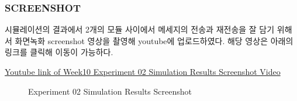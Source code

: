         \subsubsection{SCREENSHOT}
        시뮬레이션의 결과에서 2개의 모듈 사이에서 메세지의 전송과 재전송을 잘 담기 위해서 화면녹화 screenshot 영상을 촬영해 youtube에 업로드하였다. 해당 영상은 아래의 링크를 클릭해 이동이 가능하다.
        \vspace{-10mm}
            \begin{center}
                \item \href{https://youtu.be/dQ45SBRxUZ8}
            	{Youtube link of Week10 Experiment 02 Simulation Results Screenshot Video}
            \end{center}
        \vspace{-6mm}
            \begin{figure}[h!]
            \centering
            \hspace{3mm}
            \caption{Experiment 02 Simulation Results Screenshot}
            \end{figure}
            \vspace{-6mm}
\clearpage
